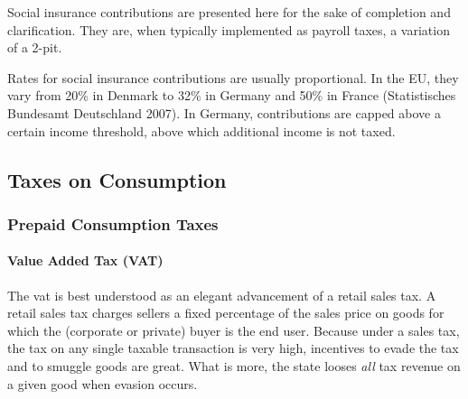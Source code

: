 Social insurance contributions are presented here for the sake of completion and clarification.
They are, when typically implemented as payroll taxes, a variation of a \gls{2-pit}.

Rates for social insurance contributions are usually proportional.
In the EU, they vary from 20\% in Denmark to 32\% in Germany and 50\% in France (Statistisches Bundesamt Deutschland 2007).
In Germany, contributions are capped above a certain income threshold, above which additional income is not taxed.

\subsection{Taxes on Consumption}


\subsubsection{Prepaid Consumption Taxes}

\paragraph{Value Added Tax (VAT)}
	\label{sec:VAT}
The  \gls{vat} is best understood as an elegant advancement of a retail sales tax.
A retail sales tax charges sellers a fixed percentage of the sales price on goods for which the (corporate or private) buyer is the end user.
Because under a sales tax, the tax on any single taxable transaction is very high, incentives to evade the tax and to smuggle goods are great.
What is more, the state looses \emph{all} tax revenue on a given good when evasion occurs.


